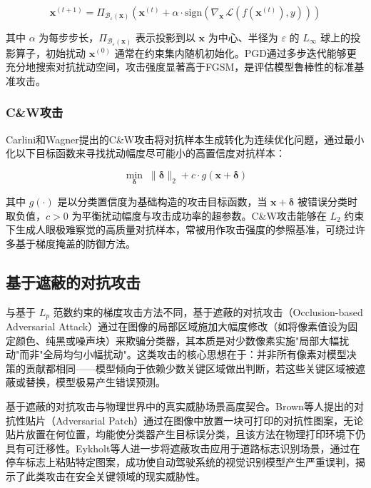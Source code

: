 \begin{equation}
  \mathbf{x}^{(t+1)} = \Pi_{\mathcal{B}_\varepsilon(\mathbf{x})} \!\left( \mathbf{x}^{(t)} + \alpha \cdot \text{sign}\!\left(\nabla_{\mathbf{x}}\, \mathcal{L}(f(\mathbf{x}^{(t)}), y)\right) \right)
\end{equation}

其中 $\alpha$ 为每步步长，$\Pi_{\mathcal{B}_\varepsilon(\mathbf{x})}$ 表示投影到以 $\mathbf{x}$ 为中心、半径为 $\varepsilon$ 的 $L_\infty$ 球上的投影算子，初始扰动 $\mathbf{x}^{(0)}$ 通常在约束集内随机初始化。PGD通过多步迭代能够更充分地搜索对抗扰动空间，攻击强度显著高于FGSM，是评估模型鲁棒性的标准基准攻击。

\subsubsection*{C\&W攻击}

Carlini和Wagner提出的C\&W攻击\cite{carlini2017cw}将对抗样本生成转化为连续优化问题，通过最小化以下目标函数来寻找扰动幅度尽可能小的高置信度对抗样本：

\begin{equation}
  \min_{\boldsymbol{\delta}} \;\|\boldsymbol{\delta}\|_2 + c \cdot g(\mathbf{x} + \boldsymbol{\delta})
\end{equation}

其中 $g(\cdot)$ 是以分类置信度为基础构造的攻击目标函数，当 $\mathbf{x}+\boldsymbol{\delta}$ 被错误分类时取负值，$c > 0$ 为平衡扰动幅度与攻击成功率的超参数。C\&W攻击能够在 $L_2$ 约束下生成人眼极难察觉的高质量对抗样本，常被用作攻击强度的参照基准，可绕过许多基于梯度掩盖的防御方法。

\subsection{基于遮蔽的对抗攻击}

与基于 $L_p$ 范数约束的梯度攻击方法不同，基于遮蔽的对抗攻击（Occlusion-based Adversarial Attack）通过在图像的局部区域施加大幅度修改（如将像素值设为固定颜色、纯黑或噪声块）来欺骗分类器，其本质是对少数像素实施"局部大幅扰动"而非"全局均匀小幅扰动"。这类攻击的核心思想在于：并非所有像素对模型决策的贡献都相同——模型倾向于依赖少数关键区域做出判断，若这些关键区域被遮蔽或替换，模型极易产生错误预测。

基于遮蔽的对抗攻击与物理世界中的真实威胁场景高度契合。Brown等人提出的对抗性贴片（Adversarial Patch）\cite{brown2017adversarialpatch}通过在图像中放置一块可打印的对抗性图案，无论贴片放置在何位置，均能使分类器产生目标误分类，且该方法在物理打印环境下仍具有可迁移性。Eykholt等人\cite{eykholt2018robust}进一步将遮蔽攻击应用于道路标志识别场景，通过在停车标志上粘贴特定图案，成功使自动驾驶系统的视觉识别模型产生严重误判，揭示了此类攻击在安全关键领域的现实威胁性。

